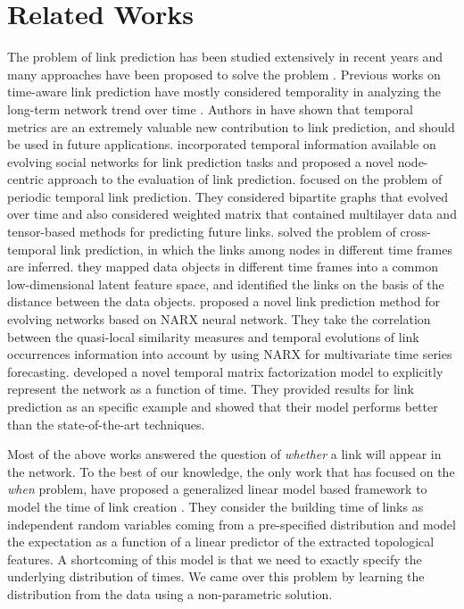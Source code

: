 \section{Related Works}\label{sec:related}

The problem of link prediction has been studied extensively in recent years and many approaches have been proposed to solve the problem \cite{2015arXiv151101868L,wang2015link,wang2014review}.
Previous works on time-aware link prediction have mostly considered temporality in analyzing the long-term network trend over time \cite{dhote2013survey}. Authors in \cite{potgieter2009temporality} have shown that temporal metrics are an extremely valuable new contribution to link prediction, and should be used in future applications. \cite{tylenda2009towards} incorporated temporal information available on evolving social networks for link prediction tasks and proposed a novel node-centric approach to the evaluation of link prediction. \cite{dunlavy2011temporal} focused on the problem of periodic temporal link prediction. They considered bipartite graphs that evolved over time and also considered weighted matrix that contained multilayer data and tensor-based methods for predicting future links. \cite{oyama2011cross} solved the problem of cross-temporal link prediction, in which the links among nodes in different time frames are inferred. they mapped data objects in different time frames into a common low-dimensional latent feature space, and identified the links on the basis of the distance between the data objects. \cite{ozcan2016temporal} proposed a novel link prediction method for evolving networks based on NARX neural network. They take the correlation between the quasi-local similarity measures and temporal evolutions of link occurrences information into account by using NARX for multivariate time series forecasting. \cite{yu2017temporally} developed a novel temporal matrix factorization model to explicitly represent the network as a function of time. They provided results for link prediction as an specific example and showed that their model performs better than the state-of-the-art techniques.

Most of the above works answered the question of \emph{whether} a link will appear in the network. To the best of our knowledge, the only work that has focused on the \emph{when} problem, have proposed a generalized linear model based framework to model the time of link creation \cite{sun2012will}. They consider the building time of links as independent random variables coming from a pre-specified distribution and model the expectation as a function of a linear predictor of the extracted topological features. A shortcoming of this model is that we need to exactly specify the underlying distribution of times. We came over this problem by learning the distribution from the data using a non-parametric solution.